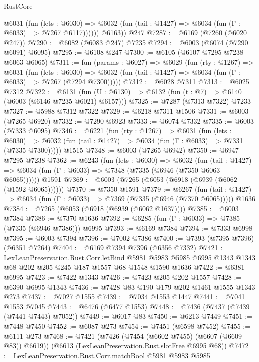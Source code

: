 \begin{lexlean}{RustCore}
\begin{coremodule}
{\begin{coremodule}
{{{{{{{{{{{{{{{{{{{{{{{{{{{{{{{{{{{{{{{{{{{{{{{            @6031
              (fun (lets : @6030) =>
              @6032 (fun (tail : @1427) => @6034 (fun (Γ : @6033) => @7267 @6117))))))
        @6163))
    @247
@7287 := @6169 (@7260 (@6020 @247))
@7290 := @6082 (@6083 @247) @7235
@7294 := @6003 (@6074 (@7290 @6091) @6095)
@7295 := @6108 @247
@7300 := @6105 (@6107 @7295 @7238 @6063 @6065)
@7311 := fun (params : @6027) =>
  @6029
    (fun (rty : @1267) =>
    @6031
      (fun (lets : @6030) =>
      @6032 (fun (tail : @1427) => @6034 (fun (Γ : @6033) => @7267 (@7294 @7300)))))
@7312 := @6028 @7311
@7313 := @6025 @7312
@7322 := @6131 (fun (U : @6130) => @6132 (fun (t : @7) => @6140 (@6003 (@6146 @7235 @6021) @6157)))
@7325 := @7287 (@7313 @7322) @7233
@7327 := @5988 @7312 @7322
@7329 := @6218 @7311 @1506
@7331 := @6003 (@7265 @6920)
@7332 := @7290 @6923
@7333 := @6074 @7332
@7335 := @6003 (@7333 @6095)
@7346 := @6221
    (fun (rty : @1267) =>
    @6031
      (fun (lets : @6030) =>
      @6032 (fun (tail : @1427) => @6034 (fun (Γ : @6033) => @7331 (@7335 @7300)))))
    @1515
@7348 := @6003 (@7265 @6942)
@7350 := @6947 @7295 @7238
@7362 := @6243
    (fun (lets : @6030) =>
    @6032
      (fun (tail : @1427) => @6034 (fun (Γ : @6033) => @7348 (@7335 (@6946 (@7350 @6063 @6065))))))
    @1591
@7369 := @6003 (@7265 (@6053 (@6918 (@6939 (@6062 (@1592 @6065))))))
@7370 := @7350 @1591
@7379 := @6267
    (fun (tail : @1427) => @6034 (fun (Γ : @6033) => @7369 (@7335 (@6946 (@7370 @6065)))))
    @1636
@7384 := @7265 (@6053 (@6918 (@6939 (@6062 @1637))))
@7385 := @6003 @7384
@7386 := @7370 @1636
@7392 := @6285 (fun (Γ : @6033) => @7385 (@7335 (@6946 @7386))) @6995
@7393 := @6169 @7384
@7394 := @7333 @6998
@7395 := @6003 @7394
@7396 := @7002 @7386
@7400 := @7393 (@7395 @7396) (@6351 @7264)
@7404 := @6169 @7394 @7396 (@6356 @7332)
@7421 := LexLeanPreservation.Rust.Corr.letBind
    @5981
    @5983
    @5985
    @6995
    @1343
    @1343
    @68
    @202
    @205
    @245
    @187
    @1557
    @68
    @1548
    @1590
    @1636
@7422 := @6381 @6995
@7423 := @7422 @1343
@7426 := @7423 @205 @202 @1557
@7428 := @6390 @6995 @1343
@7436 := @7428 @83 @190 @179 @202 @1461 @1555 @1343 @273
@7437 := @7027 @1555
@7439 := @7034 @1553 @1447
@7441 := @7041 @1553 @7045
@7443 := @6476 (@6477 @1553)
@7448 := @7436 (@7437 (@7439 (@7441 @7443) @7052))
@7449 := @6017 @83
@7450 := @6213 @7449
@7451 := @7448 @7450
@7452 := @6087 @273
@7454 := @7451 (@6598 @7452)
@7455 := @6111 @273
@7468 := @7421
    (@7426 (@7454 (@6602 @7455) (@6607 (@6609 @83)) @6619))
    (@6613 (LexLeanPreservation.Rust.slotFree @6995 @68))
@7472 := LexLeanPreservation.Rust.Corr.matchBool @5981 @5983 @5985
}}}}}}}}}}}}}}}}}}}}}}}}}}}}}}}}}}}}}}}}}}}}}}}
\end{coremodule}}
\end{coremodule}
\end{lexlean}
